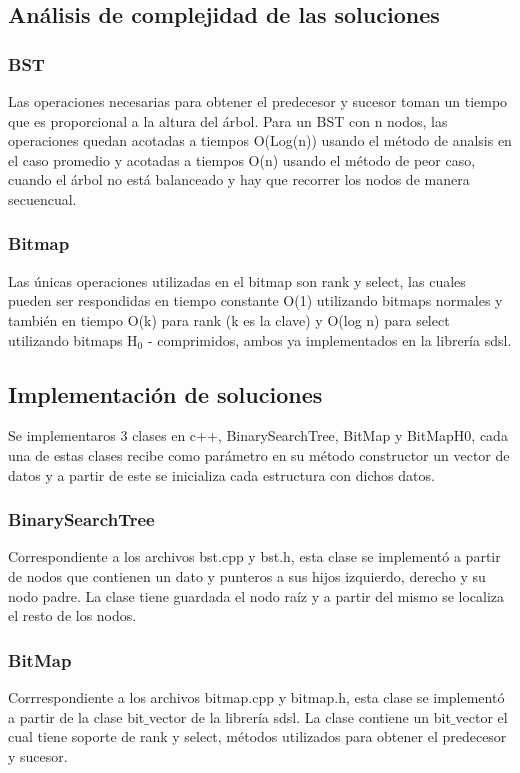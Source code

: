 \documentclass[11pt]{article}
\begin{document}
\subsection{Análisis de complejidad de las soluciones}
\subsubsection{BST}
Las operaciones necesarias para obtener el predecesor y sucesor toman un tiempo que es proporcional a la altura del árbol. Para un BST con n nodos, las operaciones quedan acotadas a tiempos O(Log(n)) usando el método de analsis en el caso promedio y acotadas a tiempos O(n) usando el método de peor caso, cuando el árbol no está balanceado y hay que recorrer los nodos de manera secuencual.
\subsubsection{Bitmap}
Las únicas operaciones utilizadas en el bitmap son rank y select, las cuales pueden ser respondidas en tiempo constante O(1) utilizando bitmaps normales y también en tiempo O(k) para rank (k es la clave) y O(log n)  para select utilizando bitmaps H$_{0}$ - comprimidos, ambos ya implementados en la librería sdsl.
\subsection{Implementación de soluciones}
Se implementaros 3 clases en c++, BinarySearchTree, BitMap y BitMapH0, cada una de estas clases recibe como parámetro en su método constructor un vector de datos y a partir de este se inicializa cada estructura con dichos datos.

\subsubsection{BinarySearchTree}
Correspondiente a los archivos bst.cpp y bst.h, esta clase se implementó a partir de nodos que contienen un dato y punteros a sus hijos izquierdo, derecho y su nodo padre. La clase tiene guardada el nodo raíz y a partir del mismo se localiza el resto de los nodos.
\subsubsection{BitMap}
Corrrespondiente a los archivos bitmap.cpp y bitmap.h, esta clase se implementó a partir de la clase bit$\_$vector de la librería sdsl. La clase contiene un bit$\_$vector el cual tiene soporte de rank y select, métodos utilizados para obtener el predecesor y sucesor.
\end{document}
